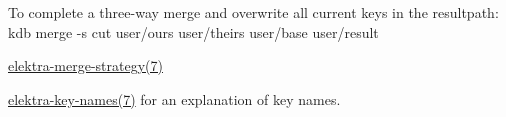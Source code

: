 To complete a three-\/way merge and overwrite all current keys in the {\ttfamily resultpath}\+:~\newline
 {\ttfamily kdb merge -\/s cut user/ours user/theirs user/base user/result}~\newline



\begin{DoxyItemize}
\item \hyperlink{doc_help_elektra-merge-strategy_md}{elektra-\/merge-\/strategy(7)}
\item \hyperlink{doc_help_elektra-key-names_md}{elektra-\/key-\/names(7)} for an explanation of key names. 
\end{DoxyItemize}